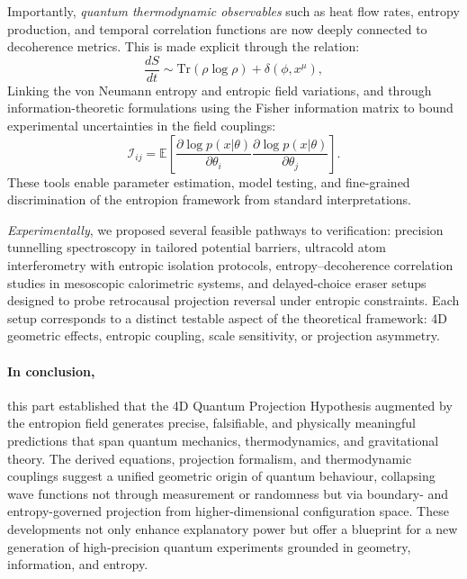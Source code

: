 \documentclass[12pt]{article}
\begin{document}
Importantly, \emph{quantum thermodynamic observables} such as heat flow rates, entropy production, and temporal correlation functions are now deeply connected to decoherence metrics. This is made explicit through the relation:
\begin{equation}
\frac{dS}{dt} \sim \text{Tr}\left( \rho \log \rho \right) + \delta(\phi, x^\mu),
\end{equation}
Linking the von Neumann entropy and entropic field variations, and through information-theoretic formulations using the Fisher information matrix to bound experimental uncertainties in the field couplings:
\begin{equation}
\mathcal{I}_{ij} = \mathbb{E}\left[ \frac{\partial \log p(x|\theta)}{\partial \theta_i} \frac{\partial \log p(x|\theta)}{\partial \theta_j} \right].
\end{equation}
These tools enable parameter estimation, model testing, and fine-grained discrimination of the entropion framework from standard interpretations.

\emph{Experimentally}, we proposed several feasible pathways to verification: precision tunnelling spectroscopy in tailored potential barriers, ultracold atom interferometry with entropic isolation protocols, entropy–decoherence correlation studies in mesoscopic calorimetric systems, and delayed-choice eraser setups designed to probe retrocausal projection reversal under entropic constraints. Each setup corresponds to a distinct testable aspect of the theoretical framework: 4D geometric effects, entropic coupling, scale sensitivity, or projection asymmetry.

\paragraph{In conclusion,} this part established that the 4D Quantum Projection Hypothesis augmented by the entropion field generates precise, falsifiable, and physically meaningful predictions that span quantum mechanics, thermodynamics, and gravitational theory. The derived equations, projection formalism, and thermodynamic couplings suggest a unified geometric origin of quantum behaviour, collapsing wave functions not through measurement or randomness but via boundary- and entropy-governed projection from higher-dimensional configuration space. These developments not only enhance explanatory power but offer a blueprint for a new generation of high-precision quantum experiments grounded in geometry, information, and entropy.
\end{document}
